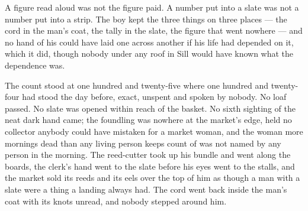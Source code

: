 A figure read aloud was not the figure paid. A number put into a slate was not a number put into a strip. The boy kept the three things on three places --- the cord in the man's coat, the tally in the slate, the figure that went nowhere --- and no hand of his could have laid one across another if his life had depended on it, which it did, though nobody under any roof in Sill would have known what the dependence was.

The count stood at one hundred and twenty-five where one hundred and twenty-four had stood the day before, exact, unspent and spoken by nobody. No loaf passed. No slate was opened within reach of the basket. No sixth sighting of the neat dark hand came; the foundling was nowhere at the market's edge,  held no collector anybody could have mistaken for a market woman, and the woman more mornings dead than any living person keeps count of was not named by any person in the morning. The reed-cutter took up his bundle and went along the boards, the clerk's hand went to the slate before his eyes went to the stalls, and the market sold its reeds and its eels over the top of him as though a man with a slate were a thing a landing always had. The cord went back inside the man's coat with its knots unread, and nobody stepped around him.
